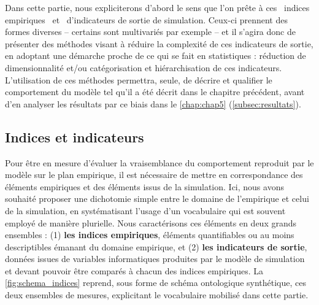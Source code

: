 Dans cette partie, nous expliciterons d'abord le sens que l'on prête à ces \og indices empiriques \fg{} et \og d'indicateurs de sortie de simulation\fg{}.
Ceux-ci prennent des formes diverses -- certains sont multivariés par exemple -- et il s'agira donc de présenter des méthodes visant à réduire la complexité de ces indicateurs de sortie, en adoptant une démarche proche de ce qui se fait en statistiques : réduction de dimensionnalité et/ou catégorisation et hiérarchisation de ces indicateurs.
L'utilisation de ces méthodes permettra, seule, de décrire et qualifier le comportement du modèle \simfeodal{} tel qu'il a été décrit dans le chapitre précédent, avant d'en analyser les résultats par ce biais dans le \cref{chap:chap5} (\cref{subsec:resultats}).

\subsection{Indices et indicateurs}\label{subsec:indices-indicateurs}

Pour être en mesure d'évaluer la vraisemblance du comportement reproduit par le modèle sur le plan empirique, il est nécessaire de mettre en correspondance des éléments empiriques et des éléments issus de la simulation.
Ici, nous avons souhaité proposer une dichotomie simple entre le domaine de l'empirique et celui de la simulation, en systématisant l'usage d'un vocabulaire qui est souvent employé de manière plurielle.
Nous caractérisons ces éléments en deux grands ensembles :
(1) \textbf{les indices empiriques}, éléments quantifiables ou au moins descriptibles émanant du domaine empirique, et (2) \textbf{les indicateurs de sortie}, données issues de variables informatiques produites par le modèle de simulation et devant pouvoir être comparés à chacun des indices empiriques.
La \cref{fig:schema_indices} reprend, sous forme de schéma ontologique synthétique, ces deux ensembles de mesures, explicitant le vocabulaire mobilisé dans cette partie.

